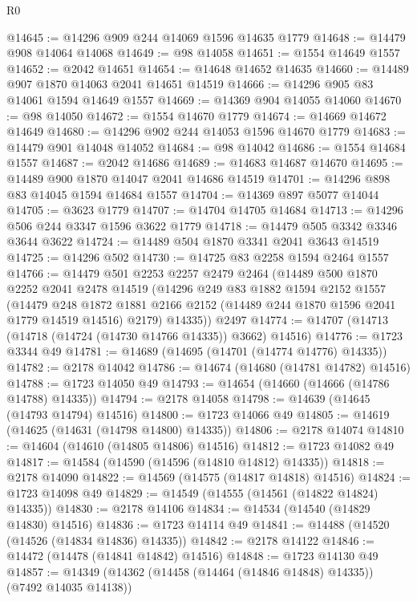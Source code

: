 \begin{lexlean}{R0}
\begin{coremodule}
@14645 := @14296 @909 @244 @14069 @1596 @14635 @1779
@14648 := @14479 @908 @14064 @14068
@14649 := @98 @14058
@14651 := @1554 @14649 @1557
@14652 := @2042 @14651
@14654 := @14648 @14652 @14635
@14660 := @14489 @907 @1870 @14063 @2041 @14651 @14519
@14666 := @14296 @905 @83 @14061 @1594 @14649 @1557
@14669 := @14369 @904 @14055 @14060
@14670 := @98 @14050
@14672 := @1554 @14670 @1779
@14674 := @14669 @14672 @14649
@14680 := @14296 @902 @244 @14053 @1596 @14670 @1779
@14683 := @14479 @901 @14048 @14052
@14684 := @98 @14042
@14686 := @1554 @14684 @1557
@14687 := @2042 @14686
@14689 := @14683 @14687 @14670
@14695 := @14489 @900 @1870 @14047 @2041 @14686 @14519
@14701 := @14296 @898 @83 @14045 @1594 @14684 @1557
@14704 := @14369 @897 @5077 @14044
@14705 := @3623 @1779
@14707 := @14704 @14705 @14684
@14713 := @14296 @506 @244 @3347 @1596 @3622 @1779
@14718 := @14479 @505 @3342 @3346 @3644 @3622
@14724 := @14489 @504 @1870 @3341 @2041 @3643 @14519
@14725 := @14296 @502
@14730 := @14725 @83 @2258 @1594 @2464 @1557
@14766 := @14479
    @501
    @2253
    @2257
    @2479
    @2464
    (@14489
      @500
      @1870
      @2252
      @2041
      @2478
      @14519
      (@14296
        @249
        @83
        @1882
        @1594
        @2152
        @1557
        (@14479
          @248
          @1872
          @1881
          @2166
          @2152
          (@14489 @244 @1870 @1596 @2041 @1779 @14519 @14516)
          @2179)
        @14335))
    @2497
@14774 := @14707 (@14713 (@14718 (@14724 (@14730 @14766 @14335)) @3662) @14516)
@14776 := @1723 @3344 @49
@14781 := @14689 (@14695 (@14701 (@14774 @14776) @14335))
@14782 := @2178 @14042
@14786 := @14674 (@14680 (@14781 @14782) @14516)
@14788 := @1723 @14050 @49
@14793 := @14654 (@14660 (@14666 (@14786 @14788) @14335))
@14794 := @2178 @14058
@14798 := @14639 (@14645 (@14793 @14794) @14516)
@14800 := @1723 @14066 @49
@14805 := @14619 (@14625 (@14631 (@14798 @14800) @14335))
@14806 := @2178 @14074
@14810 := @14604 (@14610 (@14805 @14806) @14516)
@14812 := @1723 @14082 @49
@14817 := @14584 (@14590 (@14596 (@14810 @14812) @14335))
@14818 := @2178 @14090
@14822 := @14569 (@14575 (@14817 @14818) @14516)
@14824 := @1723 @14098 @49
@14829 := @14549 (@14555 (@14561 (@14822 @14824) @14335))
@14830 := @2178 @14106
@14834 := @14534 (@14540 (@14829 @14830) @14516)
@14836 := @1723 @14114 @49
@14841 := @14488 (@14520 (@14526 (@14834 @14836) @14335))
@14842 := @2178 @14122
@14846 := @14472 (@14478 (@14841 @14842) @14516)
@14848 := @1723 @14130 @49
@14857 := @14349 (@14362 (@14458 (@14464 (@14846 @14848) @14335)) (@7492 @14035 @14138))

\end{coremodule}
\end{lexlean}

